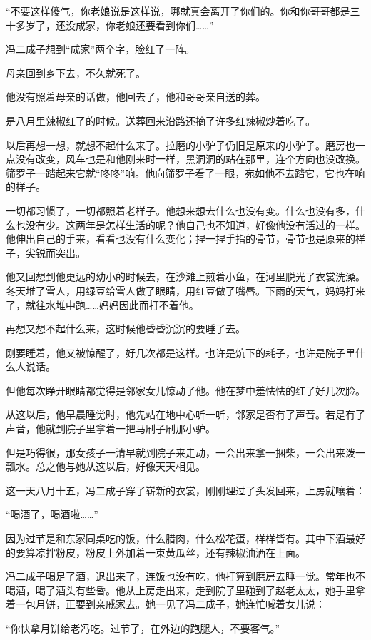 \par “不要这样傻气，你老娘说是这样说，哪就真会离开了你们的。你和你哥哥都是三十多岁了，还没成家，你老娘还要看到你们……”
\par 冯二成子想到“成家”两个字，脸红了一阵。
\par 母亲回到乡下去，不久就死了。
\par 他没有照着母亲的话做，他回去了，他和哥哥亲自送的葬。
\par 是八月里辣椒红了的时候。送葬回来沿路还摘了许多红辣椒炒着吃了。
\par 以后再想一想，就想不起什么来了。拉磨的小驴子仍旧是原来的小驴子。磨房也一点没有改变，风车也是和他刚来时一样，黑洞洞的站在那里，连个方向也没改换。筛罗子一踏起来它就“咚咚”响。他向筛罗子看了一眼，宛如他不去踏它，它也在响的样子。
\par 一切都习惯了，一切都照着老样子。他想来想去什么也没有变。什么也没有多，什么也没有少。这两年是怎样生活的呢？他自己也不知道，好像他没有活过的一样。他伸出自己的手来，看看也没有什么变化；捏一捏手指的骨节，骨节也是原来的样子，尖锐而突出。
\par 他又回想到他更远的幼小的时候去，在沙滩上煎着小鱼，在河里脱光了衣裳洗澡。冬天堆了雪人，用绿豆给雪人做了眼睛，用红豆做了嘴唇。下雨的天气，妈妈打来了，就往水堆中跑……妈妈因此而打不着他。
\par 再想又想不起什么来，这时候他昏昏沉沉的要睡了去。
\par 刚要睡着，他又被惊醒了，好几次都是这样。也许是炕下的耗子，也许是院子里什么人说话。
\par 但他每次睁开眼睛都觉得是邻家女儿惊动了他。他在梦中羞怯怯的红了好几次脸。
\par 从这以后，他早晨睡觉时，他先站在地中心听一听，邻家是否有了声音。若是有了声音，他就到院子里拿着一把马刷子刷那小驴。
\par 但是巧得很，那女孩子一清早就到院子来走动，一会出来拿一捆柴，一会出来泼一瓢水。总之他与她从这以后，好像天天相见。
\par 这一天八月十五，冯二成子穿了崭新的衣裳，刚刚理过了头发回来，上房就嚷着：
\par “喝酒了，喝酒啦……”
\par 因为过节是和东家同桌吃的饭，什么腊肉，什么松花蛋，样样皆有。其中下酒最好的要算凉拌粉皮，粉皮上外加着一束黄瓜丝，还有辣椒油洒在上面。
\par 冯二成子喝足了酒，退出来了，连饭也没有吃，他打算到磨房去睡一觉。常年也不喝酒，喝了酒头有些昏。他从上房走出来，走到院子里碰到了赵老太太，她手里拿着一包月饼，正要到亲戚家去。她一见了冯二成子，她连忙喊着女儿说：
\par “你快拿月饼给老冯吃。过节了，在外边的跑腿人，不要客气。”
